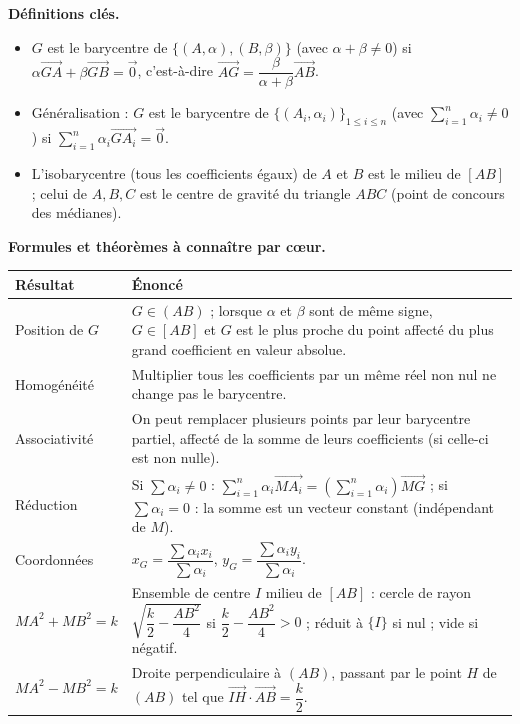 \documentclass[11pt]{article}
\newcommand{\cle}[1]{{\popxbold\color{popdark}#1}}
\begin{document}
\begin{aretenir}[L'essentiel de la le\c{c}on]
\textbf{D\'efinitions cl\'es.}
\begin{itemize}
\item $G$ est le \cle{barycentre} de $\{(A,\alpha),(B,\beta)\}$ (avec $\alpha+\beta\neq 0$) si $\alpha\overrightarrow{GA}+\beta\overrightarrow{GB}=\vec 0$, c'est-\`a-dire $\overrightarrow{AG}=\dfrac{\beta}{\alpha+\beta}\overrightarrow{AB}$.
\item G\'en\'eralisation : $G$ est le barycentre de $\{(A_i,\alpha_i)\}_{1\le i\le n}$ (avec $\sum_{i=1}^{n}\alpha_i\neq 0$) si $\sum_{i=1}^{n}\alpha_i\overrightarrow{GA_i}=\vec 0$.
\item L'\cle{isobarycentre} (tous les coefficients \'egaux) de $A$ et $B$ est le milieu de $[AB]$ ; celui de $A,B,C$ est le centre de gravit\'e du triangle $ABC$ (point de concours des m\'edianes).
\end{itemize}
\textbf{Formules et th\'eor\`emes \`a conna\^itre par c\oe ur.}
\begin{center}
\begin{tabularx}{\linewidth}{|l|X|}\hline
\rowcolor{popblueL} R\'esultat & \'Enonc\'e \\ \hline
Position de $G$ & $G\in(AB)$ ; lorsque $\alpha$ et $\beta$ sont de m\^eme signe, $G\in[AB]$ et $G$ est le plus proche du point affect\'e du plus grand coefficient en valeur absolue. \\ \hline
Homog\'en\'eit\'e & Multiplier tous les coefficients par un m\^eme r\'eel non nul ne change pas le barycentre. \\ \hline
Associativit\'e & On peut remplacer plusieurs points par leur barycentre partiel, affect\'e de la somme de leurs coefficients (si celle-ci est non nulle). \\ \hline
R\'eduction & Si $\sum\alpha_i\neq 0$ : $\sum_{i=1}^{n}\alpha_i\overrightarrow{MA_i}=\left(\sum_{i=1}^{n}\alpha_i\right)\overrightarrow{MG}$ ; si $\sum\alpha_i=0$ : la somme est un vecteur constant (ind\'ependant de $M$). \\ \hline
Coordonn\'ees & $x_G=\dfrac{\sum\alpha_i x_i}{\sum\alpha_i}$, \quad $y_G=\dfrac{\sum\alpha_i y_i}{\sum\alpha_i}$. \\ \hline
$MA^2+MB^2=k$ & Ensemble de centre $I$ milieu de $[AB]$ : cercle de rayon $\sqrt{\dfrac{k}{2}-\dfrac{AB^2}{4}}$ si $\dfrac{k}{2}-\dfrac{AB^2}{4}>0$ ; r\'eduit \`a $\{I\}$ si nul ; vide si n\'egatif. \\ \hline
$MA^2-MB^2=k$ & Droite perpendiculaire \`a $(AB)$, passant par le point $H$ de $(AB)$ tel que $\overrightarrow{IH}\cdot\overrightarrow{AB}=\dfrac{k}{2}$. \\ \hline

\end{tabularx}
\end{center}
\end{aretenir}
\end{document}

